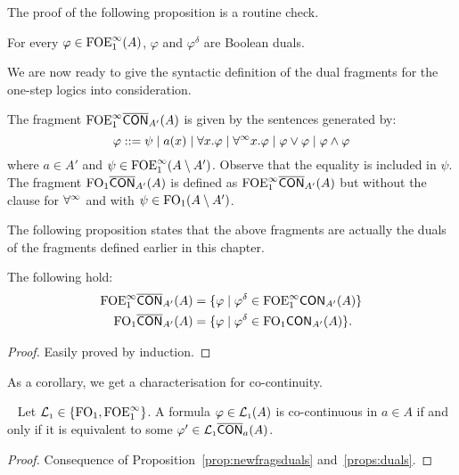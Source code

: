 \noindent The proof of the following proposition is a routine check.

\begin{proposition}\label{props:duals}
For every $\varphi \in \mathrm{FOE}^{\infty}_1(A)$, $\varphi$ and $\varphi^{\delta}$ are Boolean duals.
\end{proposition}

We are now ready to give the syntactic definition of the dual fragments for the one-step logics into consideration.

\begin{definition}\label{def:cocontfrag}\label{def:multfrag}
The fragment $\mathrm{FOE}^{\infty}_1\overline{\mathsf{CON}}_{A'}(A)$ is given by the sentences generated by:
\[
\varphi ::= \psi \mid a(x) \mid \forall x.\varphi \mid \forall^\infty x.\varphi \mid \varphi \lor \varphi \mid \varphi \land \varphi
\]
where $a\in A'$ and $\psi \in \mathrm{FOE}^{\infty}_1(A\setminus A')$. Observe that the equality is included in $\psi$. The fragment $\mathrm{FO}_1\overline{\mathsf{CON}}_{A'}(A)$ is defined as $\mathrm{FOE}^{\infty}_1\overline{\mathsf{CON}}_{A'}(A)$ but without the clause for $\forall^\infty$ and with $\psi\in \mathrm{FO}_1(A\setminus A')$.
\end{definition}

The following proposition states that the above fragments are actually the duals of the fragments defined earlier in this chapter.

\begin{proposition}\label{prop:newfragsduals}
The following hold:
	\begin{align*}
		\mathrm{FOE}^{\infty}_1\overline{\mathsf{CON}}_{A'}(A) &= \{\varphi \mid \varphi^\delta \in \mathrm{FOE}^{\infty}_1\mathsf{CON}_{A'}(A)\} \\
		\mathrm{FO}_1\overline{\mathsf{CON}}_{A'}(A) &= \{\varphi \mid \varphi^\delta \in \mathrm{FO}_1\mathsf{CON}_{A'}(A)\}.
	\end{align*}
\end{proposition}
\begin{proof}
	Easily proved by induction.
\end{proof}

\noindent As a corollary, we get a characterisation for co-continuity.

\begin{corollary}~ \label{cor:cocontinuity}
	Let $\mathcal{L}_{\scriptscriptstyle 1} \in \{\mathrm{FO}_1,\mathrm{FOE}^{\infty}_1\}$. A formula $\varphi \in \mathcal{L}_{\scriptscriptstyle 1}(A)$ is co-continuous in $a\in A$ if and only if it is equivalent to some $\varphi' \in \mathcal{L}_{\scriptscriptstyle 1}\overline{\mathsf{CON}}_{a}(A)$.
\end{corollary}
\begin{proof}
	Consequence of Proposition~\ref{prop:newfragsduals} and~\ref{props:duals}.
\end{proof}
